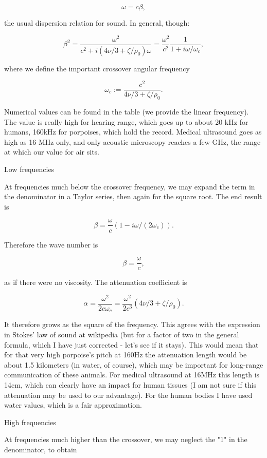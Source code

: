 \[  \omega =  c \beta , \]

the usual dispersion relation for sound. In general, though:

\[ \beta^2 =
\frac{\omega^2}{c^2+i(4\nu/3+\zeta/\rho_0)\omega}=\frac{\omega^2}{c^2}\frac{1}{1+
  i\omega/\omega_c},\]

where we define the important crossover angular frequency

\[ \omega_c := \frac{c^2}{4\nu/3+\zeta/\rho_0}.\]

Numerical values can be found in the table (we provide the linear
frequency). The value is really high for hearing range, which goes up
to about 20 kHz for humans, 160kHz for porpoises, which hold the
record. Medical ultrasound goes as high as 16 MHz only, and only
acoustic microscopy reaches a few GHz, the range at which our value
for air sits.


Low frequencies


At frequencies much below the
crossover frequency, we may expand the term in the denominator in a
Taylor series, then again for the square root. The end result is

\[ \beta = \frac{\omega}{c} (1-i   \omega/(2 \omega_c)).\]

 

Therefore the wave number is

\[ \beta = \frac{\omega}{c},\]

as if there were no viscosity. The attenuation coefficient is

\[ \alpha = \frac{\omega^2}{2 c\omega_c}=\frac{\omega^2}{2 c^3}(4\nu/3+\zeta/\rho_0). \]

It therefore grows as the square of the frequency.  This agrees with
the expression in Stokes' law of sound at wikipedia (but for a
factor of two in the general formula, which I have just corrected -
let's see if it stays). This would mean that for that very high
porpoise's pitch at 160Hz the attenuation length would be about 1.5
kilometers (in water, of course), which may be important for
long-range communication of these animals. For medical ultrasound at
16MHz this length is 14cm, which can clearly have an impact for human
tissues (I am not sure if this attenuation may be used to our
advantage). For the human bodies I have used water values, which is a
fair approximation.


High frequencies


At frequencies much
higher than the crossover, we may neglect the "1" in the denominator,
to obtain

